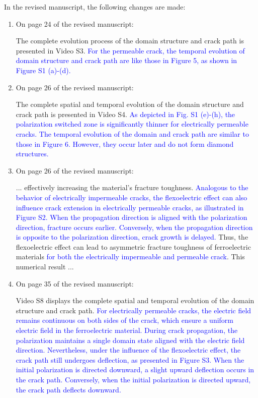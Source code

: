 \documentclass[12pt,fleqn]{article}
\begin{document}
\begin{response}
In the revised manuscript, the following changes are made:
\begin{enumerate}
    \item  On page 24 of the revised manuscript:
    \begin{revised}
    The complete evolution process of the domain structure and crack path is presented in Video S3. \textcolor{blue}{For the permeable crack, the temporal evolution of domain structure and crack path are like those in Figure 5, as shown in Figure S1 (a)-(d).}
    \end{revised}
    \item On page 26 of the revised manuscript: \begin{revised}
        The complete spatial and temporal evolution of the domain structure and crack path is presented in Video S4. \textcolor{blue}{As depicted in Fig. S1 (e)-(h), the polarization switched zone is significantly thinner for electrically permeable cracks. The temporal evolution of the domain and crack path are similar to those in Figure 6. However, they occur later and do not form diamond structures.}
    \end{revised}
    \item  On page 26 of the revised manuscript:
    \begin{revised}
        ... effectively increasing the material's fracture toughness. \textcolor{blue}{Analogous to the behavior of electrically impermeable cracks, the flexoelectric effect can also} \textcolor{blue}{influence crack extension in electrically permeable cracks, as illustrated in Figure S2. When the propagation direction is aligned with the polarization direction, fracture occurs earlier. Conversely, when the propagation direction is opposite to the polarization direction, crack growth is delayed.} Thus, the flexoelectric effect can lead to asymmetric fracture toughness of ferroelectric materials \textcolor{blue}{for both the electrically impermeable and permeable crack}. This numerical result ...
    \end{revised}
    \item On page 35 of the revised manuscript:
    \begin{revised}
        Video S8 displays the complete spatial and temporal evolution of the domain structure and crack path. \textcolor{blue}{For electrically permeable cracks, the electric field remains continuous on both sides of the crack, which ensure a uniform electric field in the ferroelectric material. During crack propagation, the polarization maintains a single domain state aligned with the electric field direction. Nevertheless, under the influence of the flexoelectric effect, the crack path still undergoes deflection, as presented in Figure S3. When the initial polarization is directed downward, a slight upward deflection occurs in the crack path. Conversely, when the initial polarization is directed upward, the crack path deflects downward.}

\end{revised}
\end{enumerate}
\end{response}
\end{document}
